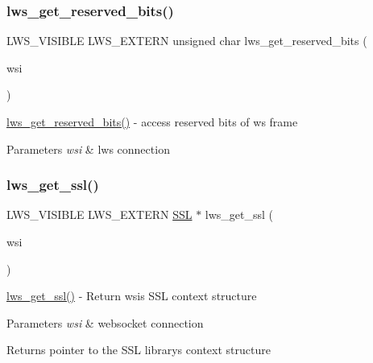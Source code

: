 \subsubsection{\texorpdfstring{lws\+\_\+get\+\_\+reserved\+\_\+bits()}{lws\_get\_reserved\_bits()}}
{\footnotesize\ttfamily L\+W\+S\+\_\+\+V\+I\+S\+I\+B\+LE L\+W\+S\+\_\+\+E\+X\+T\+E\+RN unsigned char lws\+\_\+get\+\_\+reserved\+\_\+bits (\begin{DoxyParamCaption}\item[{struct \hyperlink{structlws}{lws} $\ast$}]{wsi }\end{DoxyParamCaption})}

\hyperlink{group__wsstatus_ga3df5045656dfb6b0e63a38de2dca79d2}{lws\+\_\+get\+\_\+reserved\+\_\+bits()} -\/ access reserved bits of ws frame 
\begin{DoxyParams}{Parameters}
{\em wsi} & lws connection \\
\hline
\end{DoxyParams}
\mbox{\label{group__wsstatus_ga24192f5500a3e1702de1652fa8dda10b}} 
\subsubsection{\texorpdfstring{lws\+\_\+get\+\_\+ssl()}{lws\_get\_ssl()}}
{\footnotesize\ttfamily L\+W\+S\+\_\+\+V\+I\+S\+I\+B\+LE L\+W\+S\+\_\+\+E\+X\+T\+E\+RN \hyperlink{structssl__st}{S\+SL} $\ast$ lws\+\_\+get\+\_\+ssl (\begin{DoxyParamCaption}\item[{struct \hyperlink{structlws}{lws} $\ast$}]{wsi }\end{DoxyParamCaption})}

\hyperlink{group__wsstatus_ga24192f5500a3e1702de1652fa8dda10b}{lws\+\_\+get\+\_\+ssl()} -\/ Return wsi\textquotesingle{}s S\+SL context structure 
\begin{DoxyParams}{Parameters}
{\em wsi} & websocket connection\\
\hline
\end{DoxyParams}
Returns pointer to the S\+SL library\textquotesingle{}s context structure \mbox{\label{group__wsstatus_ga4ad226d5e01024b4046f4a5a37199aa1}} 
